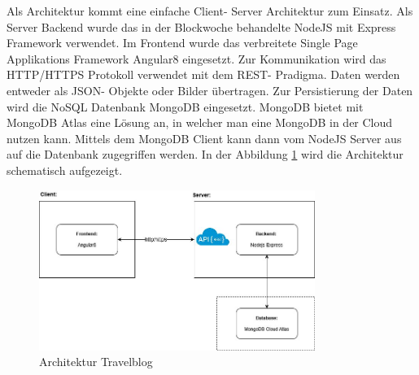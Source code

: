 \documentclass[../main.tex]{subfiles}
\begin{document}
Als Architektur kommt eine einfache Client- Server Architektur zum Einsatz. Als Server Backend wurde das in der Blockwoche behandelte NodeJS mit Express Framework verwendet. Im Frontend wurde das verbreitete Single Page Applikations Framework Angular8 eingesetzt. Zur Kommunikation wird das HTTP/HTTPS Protokoll verwendet mit dem REST- Pradigma. Daten werden entweder als JSON- Objekte oder Bilder übertragen. Zur Persistierung der Daten wird die NoSQL Datenbank MongoDB eingesetzt. MongoDB bietet mit MongoDB Atlas eine Lösung an, in welcher man eine MongoDB in der Cloud nutzen kann. Mittels dem MongoDB Client kann dann vom NodeJS Server aus auf die Datenbank zugegriffen werden. In der Abbildung \ref{fig:architektur} wird die Architektur schematisch aufgezeigt.

\vspace{0.5cm}
\begin{figure}[h]
    \centering
    \includegraphics[width=0.8\textwidth]{architektur}
    \caption{Architektur Travelblog}
    \label{fig:architektur}
\end{figure}
\end{document}
